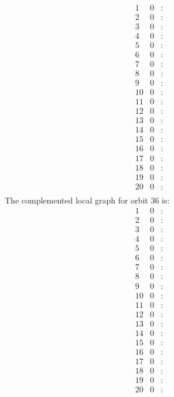 \documentclass[12pt]{article}
\begin{document}
\begin{equation*}
\begin{array}{rrcl}
1&0&:&\\
2&0&:&\\
3&0&:&\\
4&0&:&\\
5&0&:&\\
6&0&:&\\
7&0&:&\\
8&0&:&\\
9&0&:&\\
10&0&:&\\
11&0&:&\\
12&0&:&\\
13&0&:&\\
14&0&:&\\
15&0&:&\\
16&0&:&\\
17&0&:&\\
18&0&:&\\
19&0&:&\\
20&0&:&\\
\end{array}
\end{equation*}
The complemented local graph for orbit $36$ is:
\begin{equation*}
\begin{array}{rrcl}
1&0&:&\\
2&0&:&\\
3&0&:&\\
4&0&:&\\
5&0&:&\\
6&0&:&\\
7&0&:&\\
8&0&:&\\
9&0&:&\\
10&0&:&\\
11&0&:&\\
12&0&:&\\
13&0&:&\\
14&0&:&\\
15&0&:&\\
16&0&:&\\
17&0&:&\\
18&0&:&\\
19&0&:&\\
20&0&:&\\
\end{array}
\end{equation*}
\end{document}
